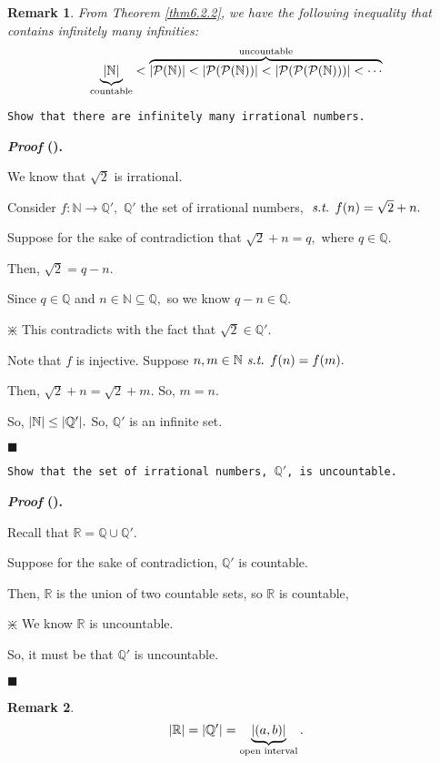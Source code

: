\documentclass[12pt,a4paper]{article}
\newcounter{nprf}[subsection]
\newtheorem*{rmk}{\indent Remark}
\newenvironment*{prf}{\par\indent\textbf{\textit{Proof} (\stepcounter{nprf}\thenprf). }\par }{\par\hfill $\blacksquare$\par}
\def\R{{\mathbb{R}}}
\def\Q{{\mathbb{Q}}}
\def\N{{\mathbb{N}}}
\def\pow{{\mathcal{P}}}
\def\st{\emph{ s.t. }}
\begin{document}
\begin{rmk}
	From Theorem \ref{thm6.2.2}, we have the following inequality that contains infinitely many infinities: \[\underbrace{\qty|\N|}_{\text{countable}}<\overbrace{\qty|\pow(\N)|<\qty|\pow(\pow(\N))|<\qty|\pow(\pow(\pow(\N)))|<\cdots}^{\text{uncountable}}\]	
\end{rmk}
\begin{framed}
\noindent\texttt{Show that there are infinitely many irrational numbers.}
\begin{prf}
	We know that $\sqrt{2}$ is irrational.\par Consider $f:\N\to\Q',$ $\Q'$ the set of irrational numbers, $\st f(n)=\sqrt{2}+n.$\par Suppose for the sake of contradiction that $\sqrt{2}+n=q,$ where $q\in\Q$.\par Then, $\sqrt{2}=q-n.$\par Since $q\in\Q$ and $n\in\N\subseteq\Q,$ so we know $q-n\in\Q.$\par\begin{center}$\divideontimes$ This contradicts with the fact that $\sqrt{2}\in\Q'.$\end{center}\par Note that $f$ is injective. Suppose $n,m\in\N\st f(n)=f(m).$\par Then, $\sqrt{2}+n=\sqrt{2}+m.$ So, $m=n.$\par So, $\qty|\N|\leq\qty|\Q'|.$ So, $\Q'$ is an infinite set.
\end{prf}
\end{framed}
\begin{framed}
\noindent\texttt{Show that the set of irrational numbers, $\Q'$, is uncountable.}	
\begin{prf}
	Recall that $\R=\Q\cup\Q'.$\par Suppose for the sake of contradiction, $\Q'$ is countable.\par Then, $\R$ is the union of two countable sets, so $\R$ is countable,\par\begin{center}$\divideontimes$ We know $\R$ is uncountable.\end{center}\par So, it must be that $\Q'$ is uncountable.
\end{prf}
\end{framed}
\begin{rmk}
\[\qty|\R|=\qty|\Q'|=\underbrace{\qty|(a,b)|}_{\text{open interval}}.\]	
\end{rmk}
\end{document}
